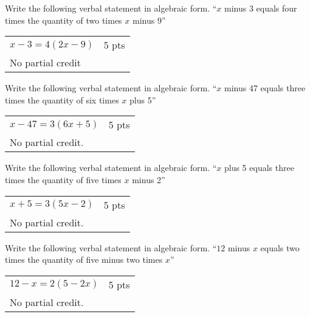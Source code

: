 {
	Write the following verbal statement in algebraic form. ``$x$ minus 3 equals four times the quantity of two times $x$ minus 9''
}
{
	\begin{tabular}{l r}
	$x - 3 = 4(2x - 9)$  & 5 pts\\
	No partial credit
	\end{tabular}
}

{
	Write the following verbal statement in algebraic form. ``$x$ minus 47 equals three times the quantity of six times $x$ plus 5''
}
{
	\begin{tabular}{l r}
	$x - 47 = 3(6x + 5)$   &    5 pts\\
	No partial credit.
	\end{tabular}
}

{
	Write the following verbal statement in algebraic form. ``$x$ plus 5 equals three times the quantity of five times $x$ minus 2''
}
{
	\begin{tabular}{l r}
	$x+5=3(5x-2)$ & 5 pts\\
	No partial credit.
	\end{tabular}
}

{
	Write the following verbal statement in algebraic form. ``$12$ minus $x$ equals  two times the quantity of five minus two times $x$''
}
{
	\begin{tabular}{l r}
	$12-x=2(5-2x)$ & 5 pts\\
	No partial credit.
	\end{tabular}
}
